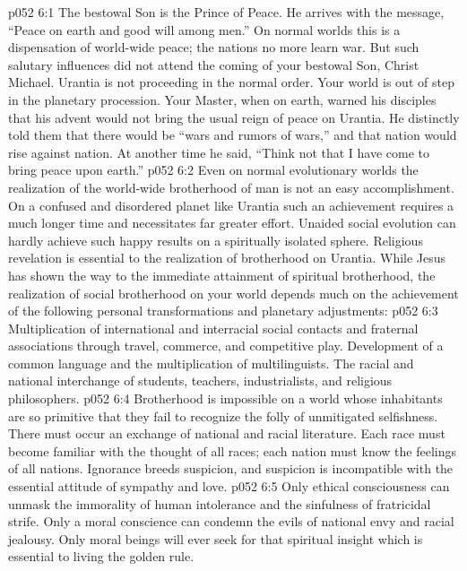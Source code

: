 \vs p052 6:1 The bestowal Son is the Prince of Peace. He arrives with the message, “Peace on earth and good will among men.” On normal worlds this is a dispensation of world\hyp{}wide peace; the nations no more learn war. But such salutary influences did not attend the coming of your bestowal Son, Christ Michael. Urantia is not proceeding in the normal order. Your world is out of step in the planetary procession. Your Master, when on earth, warned his disciples that his advent would not bring the usual reign of peace on Urantia. He distinctly told them that there would be “wars and rumors of wars,” and that nation would rise against nation. At another time he said, “Think not that I have come to bring peace upon earth.”
\vs p052 6:2 Even on normal evolutionary worlds the realization of the world\hyp{}wide brotherhood of man is not an easy accomplishment. On a confused and disordered planet like Urantia such an achievement requires a much longer time and necessitates far greater effort. Unaided social evolution can hardly achieve such happy results on a spiritually isolated sphere. Religious revelation is essential to the realization of brotherhood on Urantia. While Jesus has shown the way to the immediate attainment of spiritual brotherhood, the realization of social brotherhood on your world depends much on the achievement of the following personal transformations and planetary adjustments:
\pc \vs p052 6:3 \bibnobreakspace {} Multiplication of international and interracial social contacts and fraternal associations through travel, commerce, and competitive play. Development of a common language and the multiplication of multilinguists. The racial and national interchange of students, teachers, industrialists, and religious philosophers.
\pc \vs p052 6:4 \bibnobreakspace {} Brotherhood is impossible on a world whose inhabitants are so primitive that they fail to recognize the folly of unmitigated selfishness. There must occur an exchange of national and racial literature. Each race must become familiar with the thought of all races; each nation must know the feelings of all nations. Ignorance breeds suspicion, and suspicion is incompatible with the essential attitude of sympathy and love.
\pc \vs p052 6:5 \bibnobreakspace {} Only ethical consciousness can unmask the immorality of human intolerance and the sinfulness of fratricidal strife. Only a moral conscience can condemn the evils of national envy and racial jealousy. Only moral beings will ever seek for that spiritual insight which is essential to living the golden rule.
